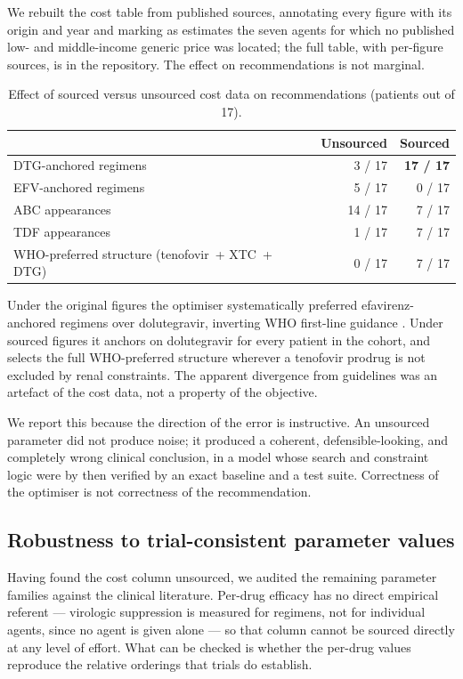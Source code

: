 \documentclass[conference]{IEEEtran}
\begin{document}
We rebuilt the cost table from published sources, annotating every figure with its origin and year and marking as estimates the seven agents for which no published low- and middle-income generic price was located; the full table, with per-figure sources, is in the repository. The effect on recommendations is not marginal.

\begin{table}[t]
\centering
\caption{Effect of sourced versus unsourced cost data on recommendations (patients out of 17).}
\label{tab:2}
\small
\begin{tabular}{@{}p{}rr@{}}
\toprule
 & \textbf{Unsourced} & \textbf{Sourced} \\
\midrule
DTG-anchored regimens & 3 / 17 & \textbf{17 / 17} \\
EFV-anchored regimens & 5 / 17 & 0 / 17 \\
ABC appearances & 14 / 17 & 7 / 17 \\
TDF appearances & 1 / 17 & 7 / 17 \\
WHO-preferred structure (tenofovir~+ XTC~+ DTG) & 0 / 17 & 7 / 17 \\
\bottomrule
\end{tabular}
\end{table}

Under the original figures the optimiser systematically preferred efavirenz-anchored regimens over dolutegravir, inverting WHO first-line guidance \cite{who2018update,who2021consolidated}. Under sourced figures it anchors on dolutegravir for every patient in the cohort, and selects the full WHO-preferred structure wherever a tenofovir prodrug is not excluded by renal constraints. The apparent divergence from guidelines was an artefact of the cost data, not a property of the objective.

We report this because the direction of the error is instructive. An unsourced parameter did not produce noise; it produced a coherent, defensible-looking, and completely wrong clinical conclusion, in a model whose search and constraint logic were by then verified by an exact baseline and a test suite. Correctness of the optimiser is not correctness of the recommendation.

\subsection{Robustness to trial-consistent parameter values}\label{sec:robustness}

Having found the cost column unsourced, we audited the remaining parameter families against the clinical literature. Per-drug efficacy has no direct empirical referent --- virologic suppression is measured for regimens, not for individual agents, since no agent is given alone --- so that column cannot be sourced directly at any level of effort. What can be checked is whether the per-drug values reproduce the relative orderings that trials do establish.
\end{document}
